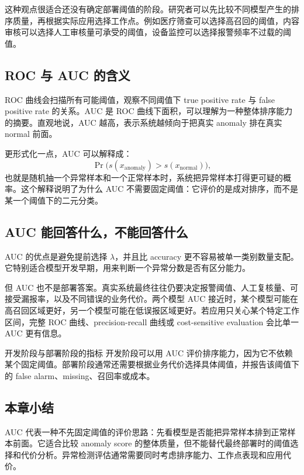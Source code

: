 \documentclass[a4paper]{article}
\begin{document}
这种观点很适合还没有确定部署阈值的阶段。研究者可以先比较不同模型产生的排序质量，再根据实际应用选择工作点。例如医疗筛查可以选择高召回的阈值，内容审核可以选择人工审核量可承受的阈值，设备监控可以选择报警频率不过载的阈值。

\subsection{ROC 与 AUC 的含义}

ROC 曲线会扫描所有可能阈值，观察不同阈值下 true positive rate 与 false positive rate 的关系。AUC 是 ROC 曲线下面积，可以理解为一种整体排序能力的摘要。直观地说，AUC 越高，表示系统越倾向于把真实 anomaly 排在真实 normal 前面。

更形式化一点，AUC 可以解释成：
\[
\Pr\bigl(s(x_{\text{anomaly}}) > s(x_{\text{normal}})\bigr),
\]
也就是随机抽一个异常样本和一个正常样本时，系统把异常样本打得更可疑的概率。这个解释说明了为什么 AUC 不需要固定阈值：它评价的是成对排序，而不是某一个阈值下的二元分类。

\subsection{AUC 能回答什么，不能回答什么}

AUC 的优点是避免提前选择 $\lambda$，并且比 accuracy 更不容易被单一类别数量支配。它特别适合模型开发早期，用来判断一个异常分数是否有区分能力。

但 AUC 也不是部署答案。真实系统最终往往仍要决定报警阈值、人工复核量、可接受漏报率，以及不同错误的业务代价。两个模型 AUC 接近时，某个模型可能在高召回区域更好，另一个模型可能在低误报区域更好。若应用只关心某个特定工作区间，完整 ROC 曲线、precision-recall 曲线或 cost-sensitive evaluation 会比单一 AUC 更有信息。

\begin{knowledgebox}{开发阶段与部署阶段的指标}
    开发阶段可以用 AUC 评价排序能力，因为它不依赖某个固定阈值。部署阶段通常还需要根据业务代价选择具体阈值，并报告该阈值下的 false alarm、missing、召回率或成本。
\end{knowledgebox}

\subsection{本章小结}

AUC 代表一种不先固定阈值的评价思路：先看模型是否能把异常样本排到正常样本前面。它适合比较 anomaly score 的整体质量，但不能替代最终部署时的阈值选择和代价分析。异常检测评估通常需要同时考虑排序能力、工作点表现和应用代价。
\end{document}
